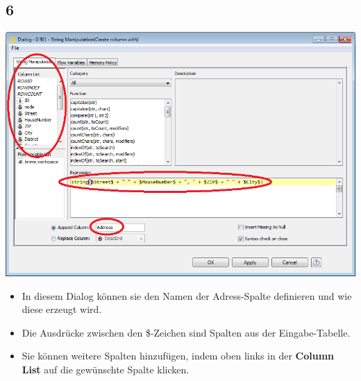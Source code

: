 \documentclass{beamer}
\begin{document}
\subsection{6}
\begin{frame}
	\begin{center}
  		\includegraphics[height=0.6\textheight]{6.png}
	\end{center}
	\begin{itemize}
		\item In diesem Dialog können sie den Namen der Adress-Spalte definieren und wie diese erzeugt wird.
		\item Die Ausdrücke zwischen den \$-Zeichen sind Spalten aus der Eingabe-Tabelle.
		\item Sie können weitere Spalten hinzufügen, indem oben links in der \textbf{Column List} auf die gewünschte Spalte klicken.
	\end{itemize}
\end{frame}
\end{document}
